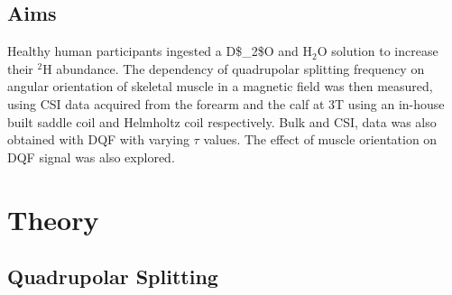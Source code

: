 \subsection{Aims}

Healthy human participants ingested a \ac{D$_2$O} and H$_2$O solution to increase their $^2$H abundance. The dependency of quadrupolar splitting frequency on angular orientation of skeletal muscle in a magnetic field was then measured, using \ac{CSI} data acquired from the forearm and the calf at 3T using an in-house built saddle coil and Helmholtz coil respectively. Bulk and \ac{CSI}, data was also obtained with \ac{DQF} with varying $\tau$ values. The effect of muscle orientation on \ac{DQF} signal was also explored.

\section{Theory}
\subsection{Quadrupolar Splitting}

